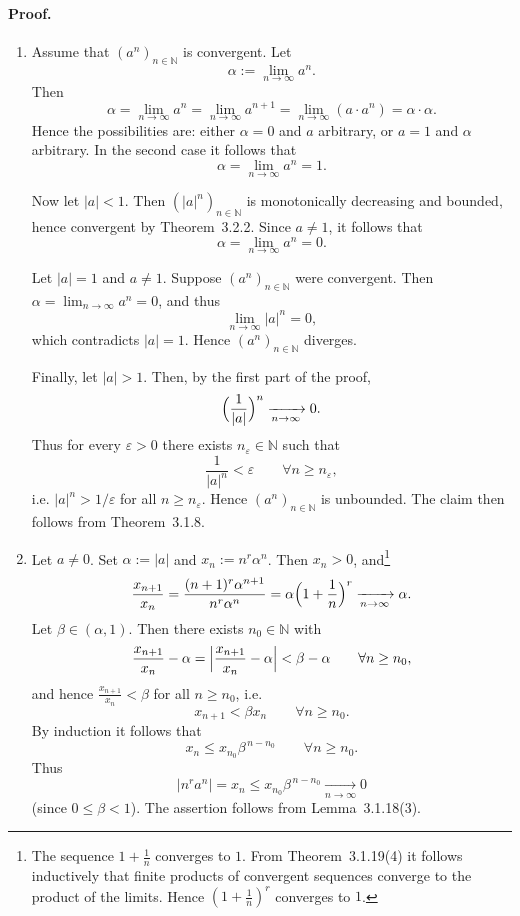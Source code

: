 \documentclass[12pt]{article}
\newcommand{\N}{\mathbb{N}}
\newcommand{\eps}{\varepsilon}
\begin{document}
\paragraph{Proof.}
\begin{enumerate}[label=(\arabic*),leftmargin=*]
    \item Assume that $(a^n)_{n\in\N}$ is convergent. Let
    \[
        \alpha := \lim_{n\to\infty} a^n.
    \]
    Then
    \[
        \alpha = \lim_{n\to\infty} a^n
        = \lim_{n\to\infty} a^{n+1}
        = \lim_{n\to\infty} (a\cdot a^n)
        = \alpha\cdot\alpha.
    \]
    Hence the possibilities are: either $\alpha=0$ and $a$ arbitrary, or $a=1$ and $\alpha$ arbitrary. In the second case it follows that
    \[
        \alpha = \lim_{n\to\infty} a^n = 1.
    \]

    Now let $|a|<1$. Then $(|a|^n)_{n\in\N}$ is monotonically decreasing and bounded, hence convergent by Theorem~3.2.2. Since $a\ne 1$, it follows that
    \[
        \alpha = \lim_{n\to\infty} a^n = 0.
    \]

    Let $|a|=1$ and $a\ne 1$. Suppose $(a^n)_{n\in\N}$ were convergent. Then $\alpha = \lim_{n\to\infty} a^n = 0$, and thus
    \[
        \lim_{n\to\infty} |a|^n = 0,
    \]
    which contradicts $|a|=1$. Hence $(a^n)_{n\in\N}$ diverges.

    Finally, let $|a|>1$. Then, by the first part of the proof,
    \[
        \Bigl(\frac1{|a|}\Bigr)^n \xrightarrow[n\to\infty]{} 0.
    \]
    Thus for every $\eps>0$ there exists $n_\eps\in\N$ such that
    \[
        \frac1{|a|^n} < \eps \qquad\forall n\ge n_\eps,
    \]
    i.e. $|a|^n > 1/\eps$ for all $n\ge n_\eps$. Hence $(a^n)_{n\in\N}$ is unbounded. The claim then follows from Theorem~3.1.8.

    \item Let $a\ne 0$. Set $\alpha := |a|$ and $x_n := n^r \alpha^n$. Then $x_n>0$, and\footnote{The sequence $1+\tfrac1n$ converges to $1$. From Theorem~3.1.19(4) it follows inductively that finite products of convergent sequences converge to the product of the limits. Hence $(1+\tfrac1n)^r$ converges to $1$.}
    \[
        \frac{x_{n+1}}{x_n}
        = \frac{(n+1)^r\alpha^{n+1}}{n^r\alpha^n}
        = \alpha\Bigl(1+\frac1n\Bigr)^r
        \xrightarrow[n\to\infty]{}\alpha.
    \]
    Let $\beta\in(\alpha,1)$. Then there exists $n_0\in\N$ with
    \[
        \frac{x_{n+1}}{x_n}-\alpha
        = \Bigl|\frac{x_{n+1}}{x_n}-\alpha\Bigr|
        < \beta-\alpha \qquad\forall n\ge n_0,
    \]
    and hence $\frac{x_{n+1}}{x_n}<\beta$ for all $n\ge n_0$, i.e.
    \[
        x_{n+1} < \beta x_n \qquad\forall n\ge n_0.
    \]
    By induction it follows that
    \[
        x_n \le x_{n_0}\beta^{\,n-n_0} \qquad\forall n\ge n_0.
    \]
    Thus
    \[
        |n^r a^n| = x_n \le x_{n_0}\beta^{\,n-n_0} \xrightarrow[n\to\infty]{} 0
    \]
    (since $0\le\beta<1$). The assertion follows from Lemma~3.1.18(3).


\end{enumerate}
\end{document}
